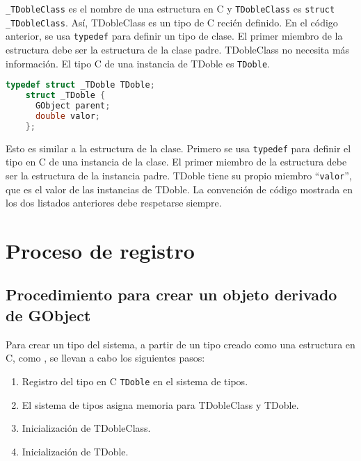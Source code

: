   \texttt{\_TDobleClass} es el nombre de una estructura en C y \texttt{TDobleClass} es \texttt{struct \_TDobleClass}.
  Así, \textsf{TDobleClass} es un tipo de C recién definido.
  En el código anterior, se usa \texttt{typedef} para definir un tipo de clase. El primer miembro de la estructura
  debe ser la estructura de la clase padre. \textsf{TDobleClass} no necesita más información. El tipo C de una
  instancia de \textsf{TDoble} es \texttt{TDoble}.
  \begin{lstlisting}[language=C]
    typedef struct _TDoble TDoble;
    struct _TDoble {
      GObject parent;
      double valor;
    };
  \end{lstlisting}
  
  Esto es similar a la estructura de la clase. Primero se usa \texttt{typedef} para definir el tipo en C de una
  instancia de la clase. El primer miembro de la estructura debe ser la estructura de la instancia padre.
  \textsf{TDoble} tiene su propio miembro ``\texttt{valor}'', que es el valor de las instancias de \textsf{TDoble}.
  La convención de código mostrada en los dos listados anteriores debe respetarse siempre.

  \section{Proceso de registro}
  \subsection{Procedimiento para crear un objeto derivado de \textsf{GObject}}
  Para crear un tipo del sistema, a partir de un tipo creado como una estructura en C,
  como , se llevan a cabo los siguientes pasos:
  \begin{enumerate}
    \tightlist
  \item Registro del tipo en C \texttt{TDoble} en el sistema de tipos.
  \item El sistema de tipos asigna memoria para \textsf{TDobleClass} y \textsf{TDoble}.
  \item Inicialización de \textsf{TDobleClass}.
  \item Inicialización de \textsf{TDoble}.
  \end{enumerate}

